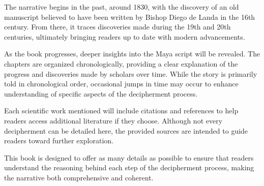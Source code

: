 \documentclass[../main.tex]{subfiles}
\begin{document}
The narrative begins in the past, around 1830, with the discovery of an old manuscript believed 
to have been written by Bishop Diego de Landa in the 16th century. 
From there, it traces discoveries made during the 19th and 20th centuries, ultimately bringing 
readers up to date with modern advancements.

As the book progresses, deeper insights into the Maya script will be revealed. 
The chapters are organized chronologically, providing a 
clear explanation of the progress and discoveries made by scholars over time. 
While the story is primarily told in chronological order, 
occasional jumps in time may occur to enhance understanding of specific aspects of 
the decipherment process.

Each scientific work mentioned will include citations and references to help readers access 
additional literature if they choose. 
Although not every decipherment can be detailed here, the provided sources are intended to guide 
readers toward further exploration.

This book is designed to offer as many details as possible to ensure that readers understand 
the reasoning behind each step of the 
decipherment process, making the narrative both comprehensive and coherent.
\end{document}
